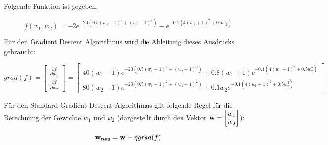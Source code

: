 Folgende Funktion ist gegeben:

$$ f(w_1, w_2) = -2 e^{-20(0.5(w_1-1)^2+(w_2-1)^2)} - e^{-0.1(4(w_1+1)^2 + 0.5w_2^2)} $$

Für den Gradient Descent Algorithmus wird die Ableitung dieses Ausdrucks gebraucht:

$$ grad(f) = \begin{bmatrix} \frac{\partial f}{\partial w_1} \\ \frac{\partial f}{\partial w_2} \end{bmatrix} = \begin{bmatrix} 40 (w_1 - 1) e^{-20(0.5(w_1-1)^2+(w_2-1)^2)} + 0.8 (w_1 + 1) e^{-0.1(4(w_1+1)^2 + 0.5w_2^2)} \\ 80 (w_2 - 1) e^{-20(0.5(w_1-1)^2+(w_2-1)^2)} + 0.1 w_2 e^{-0.1(4(w_1+1)^2 + 0.5w_2^2)} \end{bmatrix} $$

Für den Standard Gradient Descent Algorithmus gilt folgende Regel für die Berechnung der Gewichte $w_1$ und $w_2$ (dargestellt durch den Vektor $ \mathbf{w} = \begin{bmatrix} w_1 \\ w_2 \end{bmatrix} $):

$$ \mathbf{w_{neu}} = \mathbf{w} - \eta grad(f) $$